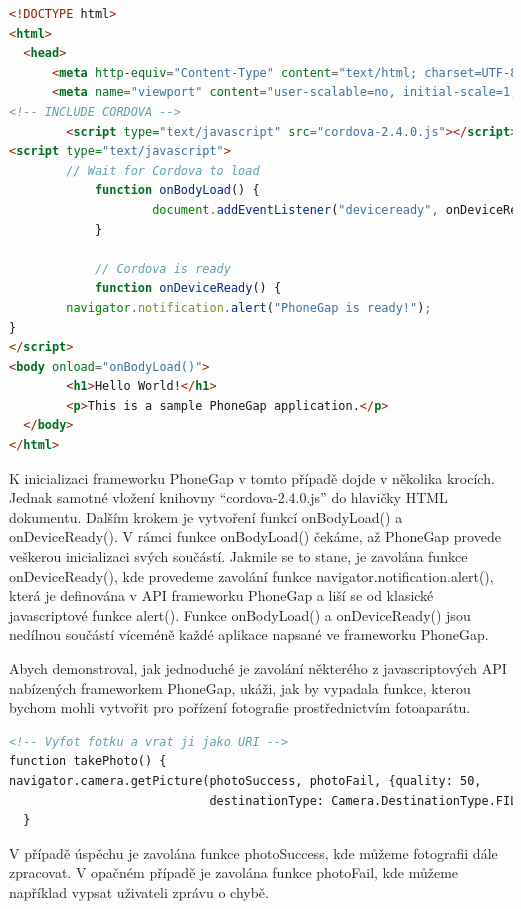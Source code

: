 \begin{lstlisting}[language=HTML,breaklines=true]
<!DOCTYPE html>
<html>
  <head>
      <meta http-equiv="Content-Type" content="text/html; charset=UTF-8" />
      <meta name="viewport" content="user-scalable=no, initial-scale=1, maximum-scale=1, minimum-scale=1, width=device-width, height=device-height, target-densitydpi=device-dpi" />
<!-- INCLUDE CORDOVA -->
        <script type="text/javascript" src="cordova-2.4.0.js"></script>
<script type="text/javascript">
        // Wait for Cordova to load
            function onBodyLoad() {
                    document.addEventListener("deviceready", onDeviceReady, false);
            }
            
            // Cordova is ready
            function onDeviceReady() {
        navigator.notification.alert("PhoneGap is ready!");
}
</script>
<body onload="onBodyLoad()">
        <h1>Hello World!</h1>
        <p>This is a sample PhoneGap application.</p>
  </body>
</html>
\end{lstlisting}

K inicializaci frameworku PhoneGap v tomto případě dojde v několika krocích. Jednak samotné vložení knihovny “cordova-2.4.0.js” do hlavičky HTML dokumentu. Dalším krokem je vytvoření funkcí onBodyLoad() a onDeviceReady(). V rámci funkce onBodyLoad() čekáme, až PhoneGap provede veškerou inicializaci svých součástí. Jakmile se to stane, je zavolána funkce onDeviceReady(), kde provedeme zavolání funkce navigator.notification.alert(), která je definována v API frameworku PhoneGap a liší se od klasické javascriptové funkce alert(). Funkce onBodyLoad() a onDeviceReady() jsou nedílnou součástí víceméně každé aplikace napsané ve frameworku PhoneGap.

Abych demonstroval, jak jednoduché je zavolání některého z javascriptových API nabízených frameworkem PhoneGap, ukáži, jak by vypadala funkce, kterou bychom mohli vytvořit pro pořízení fotografie prostřednictvím fotoaparátu.

\begin{lstlisting}[language=HTML,breaklines=true]
<!-- Vyfot fotku a vrat ji jako URI -->
function takePhoto() {
navigator.camera.getPicture(photoSuccess, photoFail, {quality: 50,
                            destinationType: Camera.DestinationType.FILE_URI});
  }
\end{lstlisting}

V případě úspěchu je zavolána funkce photoSuccess, kde můžeme fotografii dále zpracovat. V opačném případě je zavolána funkce photoFail, kde můžeme například vypsat uživateli zprávu o chybě.

